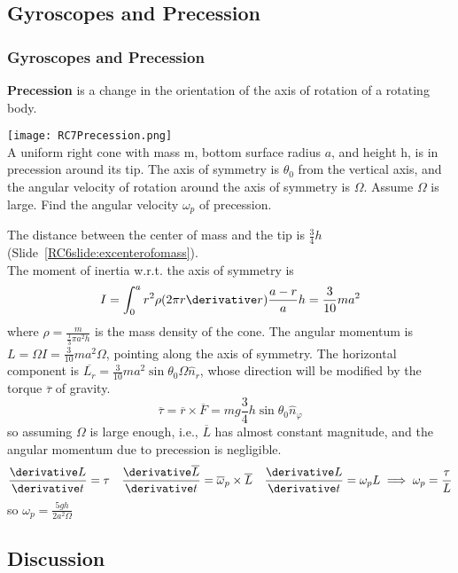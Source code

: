 \subsection{Gyroscopes and Precession}
\begin{frame}
\frametitle{Gyroscopes and Precession}
\begin{definition}
\textbf{Precession} is a change in the orientation of the axis of rotation of a rotating body.
\end{definition}
\begin{example}
\begin{multicols}{2}
\texttt{[image: RC7Precession.png]}\\
A uniform right cone with \alert{mass} m, bottom surface \alert{radius} $a$, and \alert{height} h, is in \alert{precession} around its tip. The axis of symmetry is $\theta_0$ from the vertical axis, and the \alert{angular velocity} of rotation around the axis of symmetry is $\Omega$. Assume $\Omega$ is \alert{large}. Find the angular velocity $\omega_p$ of precession.
\end{multicols}
\end{example}
\end{frame}
\begin{frame}
The distance between the \alert{center of mass} and the \alert{tip} is $\frac{3}{4}h$ (Slide~\ref{RC6slide:excenterofomass}).\\
The moment of inertia w.r.t. the axis of symmetry is
\[I=\int_0^a r^2 \rho (2\pi r\derivative r)\frac{a-r}{a}h=\frac{3}{10}ma^2\]
where $\rho=\frac{m}{\frac{1}{3}\pi a^2 h}$ is the mass density of the cone.
The angular momentum is $L=\Omega I=\frac{3}{10}ma^2\Omega$, pointing along the axis of symmetry. The horizontal component is $\overline{L_{r}}=\frac{3}{10}ma^2\sin\theta_0\Omega\hat n_r$, whose direction will be modified by the \alert{torque} $\overline\tau$ of gravity.
\[\overline\tau=\overline r\times\overline F=mg\frac{3}{4}h\sin\theta_0\hat n_\varphi\]
so assuming $\Omega$ is \alert{large} enough, i.e., $\overline L$ has almost \alert{constant magnitude}, and the angular momentum due to precession is negligible. \[\frac{\derivative L}{\derivative t}=\tau\quad\frac{\derivative \overline L}{\derivative t}=\overline \omega_p\times \overline L\quad\frac{\derivative L}{\derivative t}=\omega_p L\implies \omega_p=\frac{\tau}{L}\]
so $\omega_p=\frac{5gh}{2a^2\Omega}$
\end{frame}
\subsection{Discussion}
